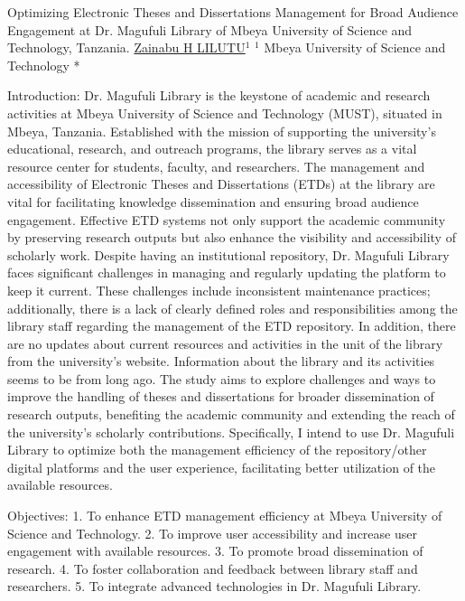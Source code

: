 
    \begin{abstract_online}{Optimizing Electronic Theses and Dissertations Management for Broad Audience Engagement at Dr. Magufuli Library of Mbeya University of Science and Technology, Tanzania.}{%
    \underline{Zainabu H LILUTU}$^{1}$}{%
}{%
    $^1$ Mbeya University of Science and Technology *\newline{}
}

Introduction: Dr. Magufuli Library is the keystone of academic and research activities at Mbeya University of Science and Technology (MUST), situated in Mbeya, Tanzania. Established with the mission of supporting the university’s educational, research, and outreach programs, the library serves as a vital resource center for students, faculty, and researchers. The management and accessibility of Electronic Theses and Dissertations (ETDs) at the library are vital for facilitating knowledge dissemination and ensuring broad audience engagement. Effective ETD systems not only support the academic community by preserving research outputs but also enhance the visibility and accessibility of scholarly work. Despite having an institutional repository, Dr. Magufuli Library faces significant challenges in managing and regularly updating the platform to keep it current. These challenges include inconsistent maintenance practices; additionally, there is a lack of clearly defined roles and responsibilities among the library staff regarding the management of the ETD repository. In addition, there are no updates about current resources and activities in the unit of the library from the university’s website. Information about the library and its activities seems to be from long ago. The study aims to explore challenges and ways to improve the handling of theses and dissertations for broader dissemination of research outputs, benefiting the academic community and extending the reach of the university’s scholarly contributions. Specifically, I intend to use Dr. Magufuli Library to optimize both the management efficiency of the repository/other digital platforms and the user experience, facilitating better utilization of the available resources.

Objectives:
1. To enhance ETD management efficiency at Mbeya University of Science and Technology.
2. To improve user accessibility and increase user engagement with available resources.
3. To promote broad dissemination of research.
4. To foster collaboration and feedback between library staff and researchers.
5. To integrate advanced technologies in Dr. Magufuli Library.


\end{abstract_online}
